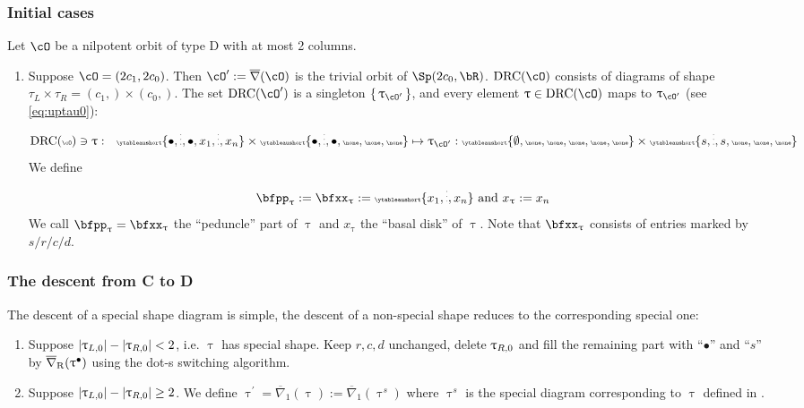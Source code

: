 \documentclass[12pt,a4paper]{amsart}
\def\abs#1{\left|{#1}\right|}
\def\eDD{\overline{\nabla}}
\def\eDDo{\overline{\nabla}_1}
\numberwithin{equation}{section}
\theoremstyle{remark}
\def\drc{\mathrm{DRC}}
\let\ytb=\ytableaushort
\newcommand{\tytb}[1]{{\tiny\ytb{#1}}}
\def\cOp{\cO^{\prime}}
\def\uptaup{\uptau^{\prime}}
\begin{document}
\subsubsection{Initial cases}
Let $\cO$ be a nilpotent orbit of type D with at most 2 columns.
\begin{enumerate}[resume*=alg1]
  \item Suppose $\cO = (2c_{1},2c_{0})$.
        Then
        $\cOp:=\eDD(\cO)$ is the trivial orbit of $\Sp(2c_{0},\bR)$. $\drc(\cO)$
        consists of diagrams of shape
        $\tau_{L}\times \tau_{R} =(c_{1},)\times (c_{0},)$.
        The set $\drc(\cOp)$ is a singleton $\set{\uptau_{\cOp}}$, and every element
        $\uptau \in \drc(\cO)$ maps to $\uptau_{\cOp}$ (see \eqref{eq:uptau0}):
        \[\tiny
          \drc(\cO)\ni \uptau: \hspace{1em} \ytb{\bullet,\vdots,\bullet,{x_{1}},\vdots,{x_{n}}}
          \times \ytb{\bullet,\vdots,\bullet,\none,\none,\none}
          \mapsto \uptau_{\cOp}:
          \ytb{\emptyset,\none,\none,\none,\none,\none}
          \times \ytb{s,\vdots,s,\none,\none,\none}
        \]
        We define
        \[
          \bfpp_{\uptau}:=\bfxx_{\uptau} := \tytb{{x_{1}},\vdots,{x_{n}}} \text{ and }x_{\uptau}:=x_{n}
        \]
        We call $\bfpp_{\uptau}=\bfxx_{\uptau}$ the ``peduncle'' part of $\uptau$ and
        $x_{\uptau}$ the
        ``basal disk'' of $\uptau$.
        Note that $\bfxx_{\uptau}$ consists of entries marked by $s/r/c/d$.
\end{enumerate}


\subsubsection{The descent from C to D}
The descent of a special shape diagram is simple, the descent of a non-special shape
reduces to the corresponding special one:
\begin{enumerate}[resume*=alg1]
  \item Suppose $\abs{\taulf} - \abs{\taurf} < 2$, i.e. $\uptau$ has special shape.
   Keep $r,c,d$ unchanged, delete $\uptau_{R,0}$ and fill the remaining part with
   ``$\bullet$'' and ``$s$'' by $\DDr(\uptau^{\bullet})$ using the dot-s switching algorithm.
   \item Suppose $\abs{\taulf} - \abs{\taurf} \geq 2$.
        We define $\uptaup=\eDDo(\uptau):=\eDDo(\uptau^{s})$ where $\uptau^{s}$ is the
        special diagram corresponding to $\uptau$ defined in .
\end{enumerate}
\end{document}
